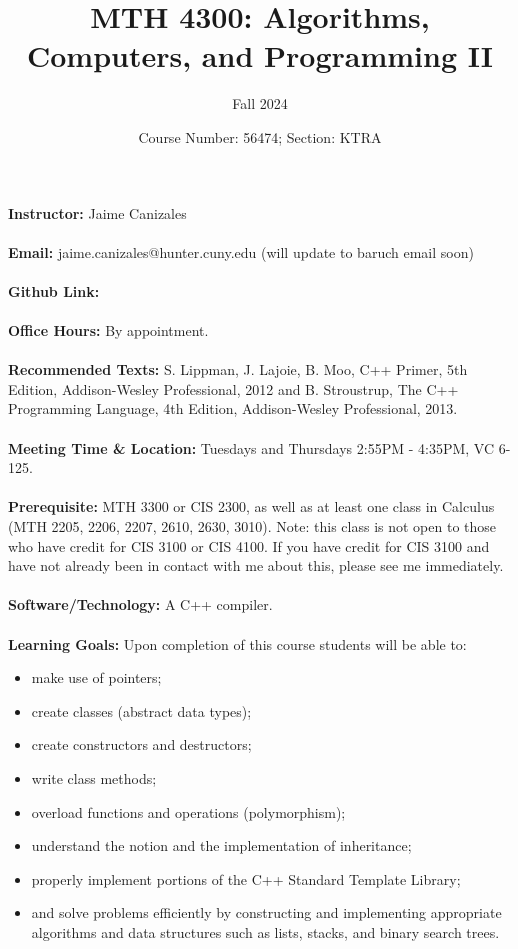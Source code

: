 \documentclass[a4paper]{article}
\title{MTH 4300: Algorithms, Computers, and Programming II}
\author{Fall 2024}
\date{Course Number: 56474; Section: KTRA}
\begin{document}
\maketitle

\textbf{Instructor:} Jaime Canizales\\\\
\textbf{Email:} jaime.canizales@hunter.cuny.edu (will update to baruch email soon)\\\\
\textbf{Github Link:} \\\\
\textbf{Office Hours:} By appointment. \\\\
\textbf{Recommended Texts:} S. Lippman, J. Lajoie, B. Moo, C++ Primer, 5th Edition, Addison-Wesley
Professional, 2012 and B. Stroustrup, The C++ Programming Language, 4th Edition, Addison-Wesley
Professional, 2013.\\\\
\textbf{Meeting Time \& Location:} Tuesdays and Thursdays 2:55PM - 4:35PM, VC 6-125.\\\\
\textbf{Prerequisite:} MTH 3300 or CIS 2300, as well as at least one class in Calculus (MTH 2205, 2206, 2207,
2610, 2630, 3010). Note: this class is not open to those who have credit for CIS 3100 or
CIS 4100. If you have credit for CIS 3100 and have not already been in contact with me
about this, please see me immediately.\\\\
\textbf{Software/Technology:} A C++ compiler. \\\\
\textbf{Learning Goals:} Upon completion of this course students will be able to:
\begin{itemize}
    \item make use of pointers;
    \item create classes (abstract data types);
    \item create constructors and destructors;
    \item write class methods;
    \item overload functions and operations (polymorphism);
    \item understand the notion and the implementation of inheritance;
    \item properly implement portions of the C++ Standard Template Library;
    \item and solve problems efficiently by constructing and implementing appropriate algorithms and
    data structures such as lists, stacks, and binary search trees.
\end{itemize}
\end{document}

